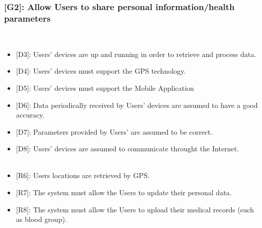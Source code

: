 \documentclass[12pt,a4paper]{article}
\begin{document}
	\subsubsection*{{[}{G2}{]}: Allow Users to share personal information/health parameters}
	\begin{itemize}\\
		\begin{itemize}
			\item {[D3]}: Users' devices are up and running in order to retrieve and process data.
			\item {[D4]}: Users' devices must support the GPS technology.
			\item {[D5]}: Users' devices must support the Mobile Application
			\item {[D6]}: Data periodically received by Users' devices are assumed to have a good accuracy. 
			\item {[D7]}: Parameters provided by Users' are assumed to be correct. 
			\item {[D8]}: Users' devices are assumed to communicate throught the Internet.
			\\ \\
			\item {[R6]}: Users locations are retrieved by GPS.
			\item {[R7]}: The system must allow the Users to update their personal data.
			\item {[R8]}: The system must allow the Users to upload their medical records (such as blood group).
		\end{itemize} 
	\end{itemize}
\end{document}
